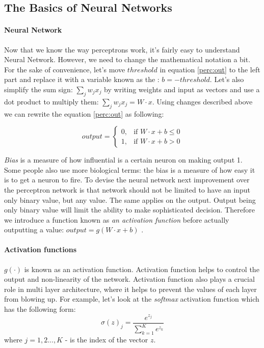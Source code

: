 \subsection{The Basics of Neural Networks}

\paragraph{Neural Network} Now that we know the way perceptrons work,
it's fairly easy to understand Neural Network. However, we need to change
the mathematical notation a bit. For the sake of convenience, let's move
$threshold$ in equation \ref{perc:out} to the left part and replace it
with a variable known as the  : $b = -threshold$. Let's also simplify
the sum sign: $\sum_j w_j x_j$ by writing weights and input as vectors and use a dot product
to multiply them:
$\sum_j w_j x_j = W \cdot x$. Using changes described above we can rewrite the
equation \ref{perc:out} as following:

\begin{equation} \label{perc:with_bias}
	output = \begin{cases} 0, & \mbox{if } W \cdot x + b\leq 0 \\ 1, & \mbox{if } W \cdot x + b > 0 \end{cases}
\end{equation}

\emph{Bias} is a measure of how influential is a certain neuron on making output 1.
Some people also use more biological terms: the bias is a measure of how easy it is
to get a neuron to fire. To devise the neural network
next improvement over the perceptron network is that network should not be limited
to have an input only binary value, but any value. The same applies on the output.
Output being only binary value will limit the ability to make sophisticated decision.
Therefore we introduce a function known as \emph{an activation function} before
actually outputting a value: $output = g( W \cdot x + b)$ \cite{Nielsen2015} .

\paragraph{Activation functions} $g(\cdot)$ is known as an activation function.
Activation function helps to control the output and non-linearity of the network.
Activation function also plays a crucial role in multi layer architecture, where it helps
to prevent the values of each layer from blowing up.
For example, let's look at the \emph{softmax} activation function which has
the following form:
\begin{equation} \label{sigmoid_function}
	\sigma(z)_j = \frac{e^{z_j}}{\sum_{k=1}^K e^{z_k}}
\end{equation}
where $j = 1,2 ..., K$ - is the index of the vector $z$.



